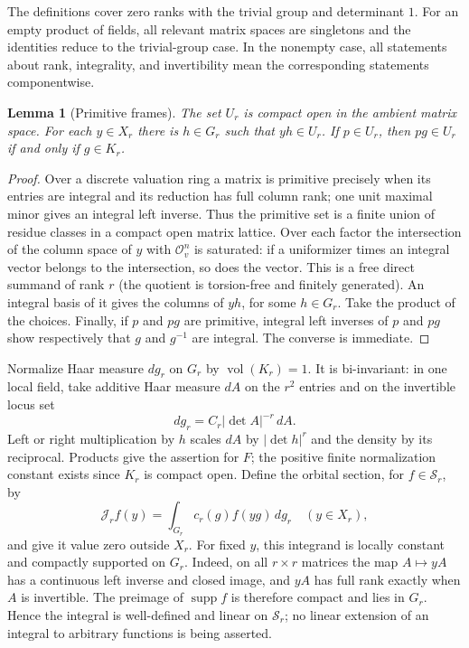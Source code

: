 \documentclass[11pt]{article}
\newtheorem{lemma}[theorem]{Lemma}
\theoremstyle{remark}\newtheorem{remark}[theorem]{Remark}
\newcommand{\SB}{\mathcal S}
\newcommand{\Orb}{\mathcal J}
\newcommand{\oo}{\mathcal O}
\newcommand{\supp}{\operatorname{supp}}
\begin{document}
The definitions cover zero ranks with the trivial group and determinant $1$. For an empty product of fields, all relevant matrix spaces are singletons and the identities reduce to the trivial-group case. In the nonempty case, all statements about rank, integrality, and invertibility mean the corresponding statements componentwise.

\begin{lemma}[Primitive frames]\label{lem:frames}
The set $U_r$ is compact open in the ambient matrix space. For each $y\in X_r$ there is $h\in G_r$ such that $yh\in U_r$. If $p\in U_r$, then $pg\in U_r$ if and only if $g\in K_r$.
\end{lemma}
\begin{proof}
Over a discrete valuation ring a matrix is primitive precisely when its entries are integral and its reduction has full column rank; one unit maximal minor gives an integral left inverse. Thus the primitive set is a finite union of residue classes in a compact open matrix lattice. Over each factor the intersection of the column space of $y$ with $\oo_v^n$ is saturated: if a uniformizer times an integral vector belongs to the intersection, so does the vector. This is a free direct summand of rank $r$ (the quotient is torsion-free and finitely generated). An integral basis of it gives the columns of $yh$, for some $h\in G_r$. Take the product of the choices. Finally, if $p$ and $pg$ are primitive, integral left inverses of $p$ and $pg$ show respectively that $g$ and $g^{-1}$ are integral. The converse is immediate.
\end{proof}

Normalize Haar measure $dg_r$ on $G_r$ by $\operatorname{vol}(K_r)=1$. It is bi-invariant: in one local field, take additive Haar measure $dA$ on the $r^2$ entries and on the invertible locus set
\[
 dg_r=C_r|\det A|^{-r}\,dA.
\]
Left or right multiplication by $h$ scales $dA$ by $|\det h|^r$ and the density by its reciprocal. Products give the assertion for $F$; the positive finite normalization constant exists since $K_r$ is compact open. Define the orbital section, for $f\in\SB_r$, by
\begin{equation}\label{eq:J}
 \Orb_r f(y)=\int_{G_r}c_r(g) f(yg)\,dg_r\quad(y\in X_r),
\end{equation}
and give it value zero outside $X_r$. For fixed $y$, this integrand is locally constant and compactly supported on $G_r$. Indeed, on all $r\times r$ matrices the map $A\mapsto yA$ has a continuous left inverse and closed image, and $yA$ has full rank exactly when $A$ is invertible. The preimage of $\supp f$ is therefore compact and lies in $G_r$. Hence the integral is well-defined and linear on $\SB_r$; no linear extension of an integral to arbitrary functions is being asserted.
\end{document}

